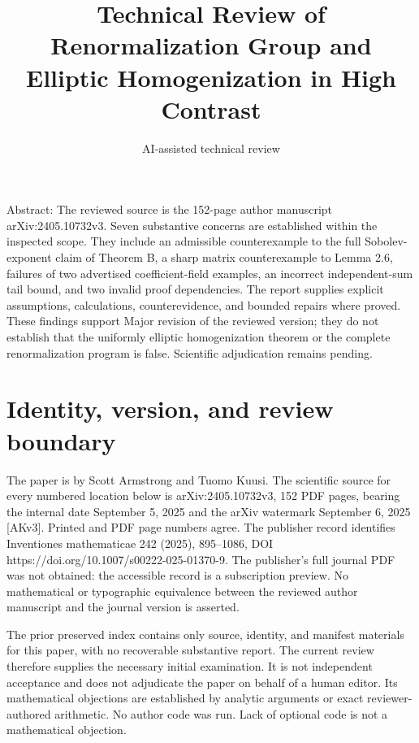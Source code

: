 \documentclass[10pt]{article}
\title{Technical Review of
Renormalization Group and Elliptic Homogenization in High Contrast}
\author{AI-assisted technical review}
\date{}
\begin{document}
\maketitle
Abstract: The reviewed source is the 152-page author manuscript arXiv:2405.10732v3. Seven substantive concerns are established within the inspected scope. They include an admissible counterexample to the full Sobolev-exponent claim of Theorem B, a sharp matrix counterexample to Lemma 2.6, failures of two advertised coefficient-field examples, an incorrect independent-sum tail bound, and two invalid proof dependencies. The report supplies explicit assumptions, calculations, counterevidence, and bounded repairs where proved. These findings support Major revision of the reviewed version; they do not establish that the uniformly elliptic homogenization theorem or the complete renormalization program is false. Scientific adjudication remains pending.\par
\section*{Identity, version, and review boundary}
The paper is by Scott Armstrong and Tuomo Kuusi. The scientific source for every numbered location below is arXiv:2405.10732v3, 152 PDF pages, bearing the internal date September 5, 2025 and the arXiv watermark September 6, 2025 [AKv3]. Printed and PDF page numbers agree. The publisher record identifies Inventiones mathematicae 242 (2025), 895–1086, DOI https://doi.org/10.1007/s00222-025-01370-9. The publisher’s full journal PDF was not obtained: the accessible record is a subscription preview. No mathematical or typographic equivalence between the reviewed author manuscript and the journal version is asserted.\par
The prior preserved index contains only source, identity, and manifest materials for this paper, with no recoverable substantive report. The current review therefore supplies the necessary initial examination. It is not independent acceptance and does not adjudicate the paper on behalf of a human editor. Its mathematical objections are established by analytic arguments or exact reviewer-authored arithmetic. No author code was run. Lack of optional code is not a mathematical objection.\par
\end{document}
